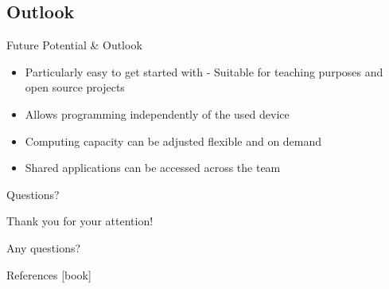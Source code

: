 \documentclass{beamer}
\begin{document}
\subsection{Outlook}
\begin{frame}{Future Potential \& Outlook}
  \begin{itemize}
    \large
    \setlength\itemsep{0.8em}
    \item Particularly easy to get started with - Suitable for teaching purposes and open source projects
    \item Allows programming independently of the used device
    \item Computing capacity can be adjusted flexible and on demand
    \item Shared applications can be accessed across the team
  \end{itemize}
\end{frame}


\appendix
\begin{frame}{Questions?}
  \begin{center}
    Thank you for your attention!

    Any questions?
  \end{center}
\end{frame}


\begin{frame}[allowframebreaks]{References}
  \small
  [book]
  {}
  
\end{frame}
\end{document}
